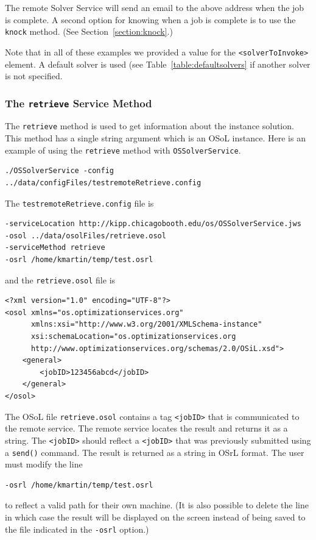 \documentclass[11pt]{article}
\renewcommand{\_}{{\char"5F}}
\renewcommand{\{}{{\char"7B}}
\renewcommand{\}}{{\char"7D}}
\renewcommand{\^}{{\char"0D}}
\renewcommand{\'}{{\char"0D}}
\begin{document}
\begin{enumerate}[Step 1:]
The remote Solver Service will send an email to the above address when the job is complete. A second option for
knowing when a job is complete is to use the {\tt knock} method.
(See Section~\ref{section:knock}.)

Note that in all of these examples we provided a value for the {\tt <solverToInvoke>} element.
A default solver is used (see Table~\ref{table:defaultsolvers} if another solver is not specified.%



\subsubsection{The  {\tt retrieve} Service Method}\label{section:retrieve}

The {\tt retrieve} method is used to get information about the instance solution.  This method has a single string argument which is an OSoL instance. Here is an example of using the {\tt retrieve} method with {\tt OSSolverService}.
\begin{verbatim}
./OSSolverService -config ../data/configFiles/testremoteRetrieve.config
\end{verbatim}
The {\tt testremoteRetrieve.config} file is
\begin{verbatim}
-serviceLocation http://kipp.chicagobooth.edu/os/OSSolverService.jws
-osol ../data/osolFiles/retrieve.osol
-serviceMethod retrieve
-osrl /home/kmartin/temp/test.osrl
\end{verbatim}
and the {\tt retrieve.osol} file is

\begin{verbatim}
<?xml version="1.0" encoding="UTF-8"?>
<osol xmlns="os.optimizationservices.org"
      xmlns:xsi="http://www.w3.org/2001/XMLSchema-instance"
      xsi:schemaLocation="os.optimizationservices.org
      http://www.optimizationservices.org/schemas/2.0/OSiL.xsd">
    <general>
        <jobID>123456abcd</jobID>
    </general>
</osol>
\end{verbatim}

The OSoL file {\tt retrieve.osol} contains a tag {\tt <jobID>} that is communicated to
the remote service. The remote service locates the result and returns it as a string.
The {\tt <jobID>} should reflect a {\tt <jobID>} that was previously submitted
using a {\tt send()} command.
The result is returned as a string in OSrL format.  The user must modify the line
\begin{verbatim}
-osrl /home/kmartin/temp/test.osrl
\end{verbatim}
to reflect a valid path for their own machine.  (It is also possible to delete the line
in which case the result will be displayed on the screen instead of being saved to the
file indicated in the {\tt -osrl} option.)



\end{enumerate}
\end{document}
